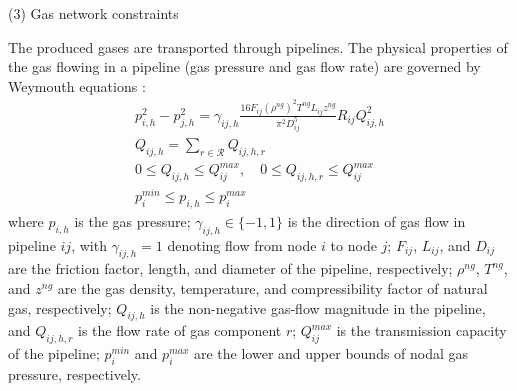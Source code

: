 \documentclass[sn-mathphys,Numbered]{sn-jnl}%
\theoremstyle{plain}%
\theoremstyle{definition}%
\theoremstyle{remark}%
\begin{document}
(3) Gas network constraints

The produced gases are transported through pipelines. The physical properties of the gas flowing in a pipeline (gas pressure and gas flow rate) are governed by Weymouth equations \cite{an2003natural}:
\begin{gather}
    p_{i,h}^2 - p_{j,h}^2 = \gamma_{ij,h} \frac{16 F_{ij} (\rho^{ng})^2 T^{ng} L_{ij}z^{ng}}{\pi^2 D_{ij}^5} {R}_{ij} {Q}_{ij,h}^2
\label{eq gas flow weymouth} \\
     Q_{ij,h} = \sum_{r \in \mathcal{R}} Q_{ij,h,r}
\label{eq gas flow sum, gas constant} \\
    0 \leq Q_{ij,h} \leq Q_{ij}^{max}, \quad 0 \leq Q_{ij,h,r} \leq Q_{ij}^{max}
\label{eq capacity pipeline} \\
    p_i^{min} \leq p_{i,h} \leq p_i^{max}
\label{eq pressure limit}
\end{gather}
where $p_{i,h}$ is the gas pressure; $\gamma_{ij,h} \in \{-1,1\}$ is the direction of gas flow in pipeline $ij$, with $\gamma_{ij,h}=1$ denoting flow from node $i$ to node $j$; $F_{ij}$, $L_{ij}$, and $D_{ij}$ are the friction factor, length, and diameter of the pipeline, respectively; $\rho^{ng}$, $T^{ng}$, and $z^{ng}$ are the gas density, temperature, and compressibility factor of natural gas, respectively; $Q_{ij,h}$ is the non-negative gas-flow magnitude in the pipeline, and $Q_{ij,h,r}$ is the flow rate of gas component $r$; $Q_{ij}^{max}$ is the transmission capacity of the pipeline; $p_i^{min}$ and $p_i^{max}$ are the lower and upper bounds of nodal gas pressure, respectively.
\end{document}
